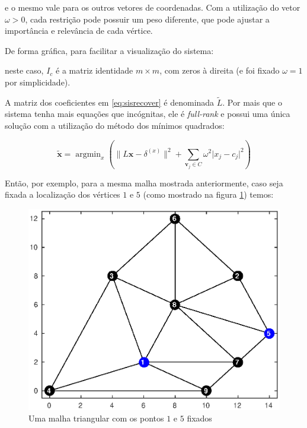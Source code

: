 \noindent e o mesmo vale para os outros vetores de coordenadas. Com a utilização do vetor $\omega > 0$, cada restrição pode possuir um peso diferente, que pode ajustar a importância e relevância de cada vértice.

De forma gráfica, para facilitar a visualização do sistema:

\begin{center}
\end{center}

\noindent neste caso, $I_c$ é a matriz identidade $m \times m$, com zeros à direita (e foi fixado $\omega = 1$ por simplicidade).

A matriz dos coeficientes em \ref{eq:sisrecover} é denominada $\tilde{L}$. Por mais que o sistema tenha mais equações que incógnitas, ele é \textit{full-rank} e possui uma única solução com a utilização do método dos mínimos quadrados:

\begin{equation}\label{eq:leastsqrsol}
\mathbf{\tilde{x}} = \mathop{\mathrm{argmin}}_x \left( \lVert L \mathbf{x} - \delta^{(x)} \rVert^2 + \sum_{\mathbf{v}_j \in C} \omega^2 \lvert x_j - c_j \rvert^2  \right)
\end{equation}

Então, por exemplo, para a mesma malha mostrada anteriormente, caso seja fixada a localização dos vértices $1$ e $5$ (como mostrado na figura \ref{fig:fixedmesh}) temos:

\begin{figure}[ht!]
	\centering
	\includegraphics[width=.6\linewidth]{imagens/cap4/grafofixado.eps}
	\caption{Uma malha triangular com os pontos $1$ e $5$ fixados}
	\label{fig:fixedmesh}
\end{figure}

